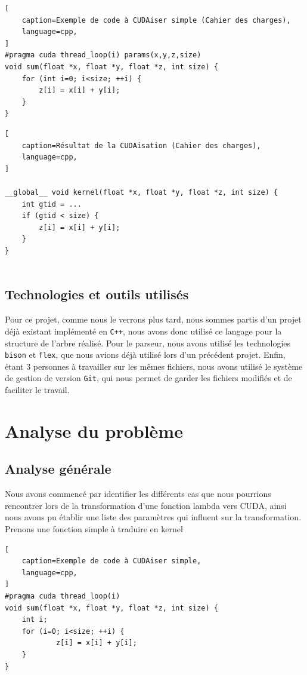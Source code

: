 \documentclass{article}
\begin{document}
\begin{lstlisting}[
	caption=Exemple de code à CUDAiser simple (Cahier des charges),
    language=cpp,
]
#pragma cuda thread_loop(i) params(x,y,z,size) 
void sum(float *x, float *y, float *z, int size) { 
	for (int i=0; i<size; ++i) {
		z[i] = x[i] + y[i];
	}
}
\end{lstlisting}	
\begin{lstlisting}[
	caption=Résultat de la CUDAisation (Cahier des charges),
    language=cpp,
]	

__global__ void kernel(float *x, float *y, float *z, int size) { 
	int gtid = ...
	if (gtid < size) {
		z[i] = x[i] + y[i];
	}
}
	
	\end{lstlisting}	
	
	\subsection{Technologies et outils utilisés}
	
	Pour ce projet, comme nous le verrons plus tard, nous sommes partis d'un projet déjà existant implémenté en \verb|C++|, nous avons donc utilisé ce langage pour la structure de l'arbre réalisé.
	Pour le parseur, nous avons utilisé les technologies \verb|bison| et \verb|flex|, que nous avions déjà utilisé lors d'un précédent projet.
	Enfin, étant 3 personnes à travailler sur les mêmes fichiers, nous avons utilisé le système de gestion de version \verb|Git|, qui nous permet de garder les fichiers modifiés et de faciliter le travail.
	
	\newpage	
	
	\section{Analyse du problème}
	
	\subsection{Analyse générale}
	
	Nous avons commencé par identifier les différents cas que nous pourrions rencontrer lors de la transformation d'une fonction lambda vers CUDA, ainsi nous avons pu établir une liste des paramètres qui influent sur la transformation.
	\\Prenons une fonction simple à traduire en kernel
		\begin{lstlisting}[
	caption=Exemple de code à CUDAiser simple,
    language=cpp,
]
#pragma cuda thread_loop(i) 
void sum(float *x, float *y, float *z, int size) { 
	int i;
	for (i=0; i<size; ++i) {
			z[i] = x[i] + y[i];
	}
}
\end{lstlisting}	
\end{document}
